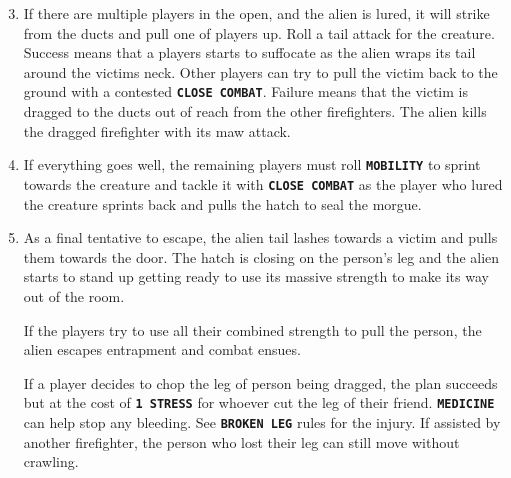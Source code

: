 \clearpage

\begin{rpg-commentbox}{}
\begin{enumerate}
   \setcounter{enumi}{2}
   \item If there are multiple players in the open, and the alien is lured, it will strike from the ducts and pull one of players up. Roll a tail attack for the creature. Success means that a players starts to suffocate as the alien wraps its tail around the victims neck. Other players can try to pull the victim back to the ground with a contested \texttt{\textbf{CLOSE COMBAT}}. Failure means that the victim is dragged to the ducts out of reach from the other firefighters. The alien kills the dragged firefighter with its maw attack.

   \item If everything goes well, the remaining players must roll \texttt{\textbf{MOBILITY}} to sprint towards the creature and tackle it with \texttt{\textbf{CLOSE COMBAT}} as the player who lured the creature sprints back and pulls the hatch to seal the morgue. 
   

   \item As a final tentative to escape, the alien tail lashes towards a victim and pulls them towards the door. The hatch is closing on the person's leg and the alien starts to stand up getting ready to use its massive strength to make its way out of the room.
   
   If the players try to use all their combined strength to pull the person, the alien escapes entrapment and combat ensues. 

   If a player decides to chop the leg of person being dragged, the plan succeeds but at the cost of \texttt{\textbf{1 STRESS}} for whoever cut the leg of their friend.  \texttt{\textbf{MEDICINE}} can help stop any bleeding.     
   See \texttt{\textbf{BROKEN LEG}} rules for the injury. If assisted by another firefighter, the person who lost their leg can still move without crawling. 
\end{enumerate}
\end{rpg-commentbox}



